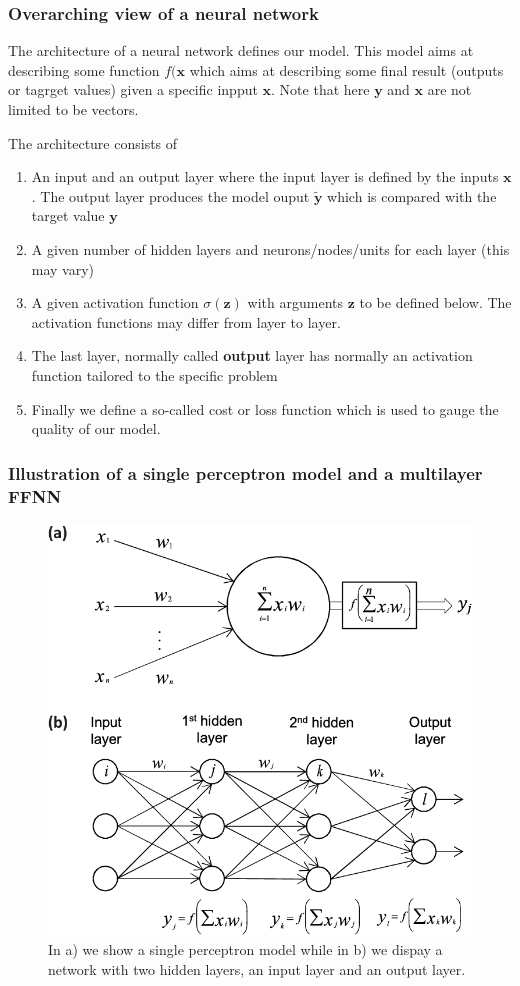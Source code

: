 \documentclass{beamer}
\begin{document}
\begin{frame}
\frametitle{Overarching view of a neural network}

The architecture of a neural network defines our model. This model
aims at describing some function $f(\bm{x}$ which aims at describing
some final result (outputs or tagrget values) given a specific inpput
$\bm{x}$. Note that here $\bm{y}$ and $\bm{x}$ are not limited to be
vectors.

The architecture consists of
\begin{enumerate}
\item An input and an output layer where the input layer is defined by the inputs $\bm{x}$. The output layer produces the model ouput $\bm{\tilde{y}}$ which is compared with the target value $\bm{y}$

\item A given number of hidden layers and neurons/nodes/units for each layer (this may vary)

\item A given activation function $\sigma(\bm{z})$ with arguments $\bm{z}$ to be defined below. The activation functions may differ from layer to layer.

\item The last layer, normally called \textbf{output} layer has normally an activation function tailored to the specific problem

\item Finally we define a so-called cost or loss function which is used to gauge the quality of our model. 
\end{enumerate}

\noindent
\end{frame}

\begin{frame}
\frametitle{Illustration of a single perceptron model and a multilayer FFNN}

\begin{figure}[!ht]  %
  \centerline{\includegraphics[width=0.7\linewidth]{figures/nns.png}}
  \caption{
  In a) we show a single perceptron model while in b) we dispay a network with two  hidden layers, an input layer and an output layer.
  }
\end{figure}
\end{frame}
\end{document}
